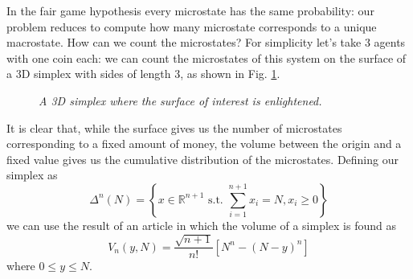 In the fair game hypothesis every microstate has the same probability: our problem reduces to compute how many microstate corresponds to a unique macrostate.
How can we count the microstates?
For simplicity let's take 3 agents with one coin each: we can count the microstates of this system on the surface of a 3D simplex with sides of length 3, as shown in Fig. \ref{fig:threeSimplex}.
\begin{figure}[ht!]
    \centering
    \caption{\emph{A 3D simplex where the surface of interest is enlightened.}}
    \label{fig:threeSimplex}
\end{figure}
It is clear that, while the surface gives us the number of microstates corresponding to a fixed amount of money, the volume between the origin and a fixed value gives us the cumulative distribution of the microstates.
Defining our simplex as
\begin{equation*}
    \Delta^n(N)=\left\{x \in \mathbb{R}^{n+1}\text{ s.t. } \sum_{i = 1}^{n + 1}x_i = N, x_i \geq 0\right\}
\end{equation*}
we can use the result of an article \cite{simplexSampling} in which the volume of a simplex is found as
\begin{equation}
    V_n\left(y, N\right) = \frac{\sqrt{n+1}}{n!}\left[N^n - \left(N - y\right)^n\right]
\end{equation}
where $0 \leq y \leq N$.
